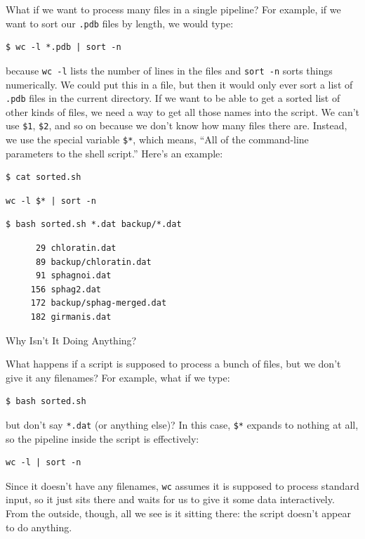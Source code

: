 \documentclass{book}
\begin{document}
What if we want to process many files in a single pipeline? For example,
if we want to sort our \texttt{.pdb} files by length, we would type:

\begin{verbatim}
$ wc -l *.pdb | sort -n
\end{verbatim}

because \texttt{wc -l} lists the number of lines in the files and
\texttt{sort -n} sorts things numerically. We could put this in a file,
but then it would only ever sort a list of \texttt{.pdb} files in the
current directory. If we want to be able to get a sorted list of other
kinds of files, we need a way to get all those names into the script. We
can't use \texttt{\$1}, \texttt{\$2}, and so on because we don't know
how many files there are. Instead, we use the special variable
\texttt{\$*}, which means, ``All of the command-line parameters to the
shell script.'' Here's an example:

\begin{verbatim}
$ cat sorted.sh
\end{verbatim}

\begin{verbatim}
wc -l $* | sort -n
\end{verbatim}

\begin{verbatim}
$ bash sorted.sh *.dat backup/*.dat
\end{verbatim}

\begin{verbatim}
      29 chloratin.dat
      89 backup/chloratin.dat
      91 sphagnoi.dat
     156 sphag2.dat
     172 backup/sphag-merged.dat
     182 girmanis.dat
\end{verbatim}

\begin{swcbox}{Why Isn't It Doing Anything?}

What happens if a script is supposed to process a bunch of files, but we
don't give it any filenames? For example, what if we type:

\begin{verbatim}
$ bash sorted.sh
\end{verbatim}

but don't say \texttt{*.dat} (or anything else)? In this case,
\texttt{\$*} expands to nothing at all, so the pipeline inside the
script is effectively:

\begin{verbatim}
wc -l | sort -n
\end{verbatim}

Since it doesn't have any filenames, \texttt{wc} assumes it is supposed
to process standard input, so it just sits there and waits for us to
give it some data interactively. From the outside, though, all we see is
it sitting there: the script doesn't appear to do anything.

\end{swcbox}
\end{document}
